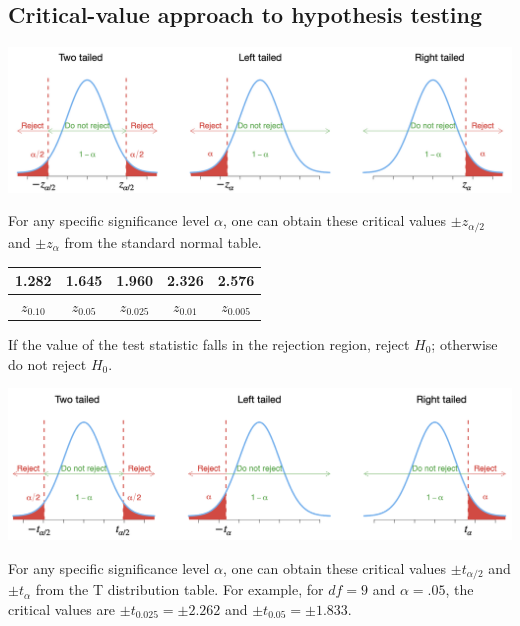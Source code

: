 \documentclass[
]{article}
\begin{document}
\hypertarget{critical-value-approach-to-hypothesis-testing}{%
\subsection{Critical-value approach to hypothesis
testing}\label{critical-value-approach-to-hypothesis-testing}}

\begin{center}\includegraphics[width=1.3\linewidth,height=1\textheight]{hypoztest} \end{center}

For any specific significance level \(\alpha\), one can obtain these
critical values \(\pm z_{\alpha/2}\) and \(\pm z_{\alpha}\) from the
standard normal table.

\begin{longtable}[]{@{}ccccc@{}}
\toprule()
1.282 & 1.645 & 1.960 & 2.326 & 2.576 \\
\midrule()
\endhead
\(z_{0.10}\) & \(z_{0.05}\) & \(z_{0.025}\) & \(z_{0.01}\) &
\(z_{0.005}\) \\
\bottomrule()
\end{longtable}

If the value of the test statistic falls in the rejection region, reject
\(H_0\); otherwise do not reject \(H_0\).

\begin{center}\includegraphics[width=1.3\linewidth,height=0.8\textheight]{hypottest} \end{center}

For any specific significance level \(\alpha\), one can obtain these
critical values \(\pm t_{\alpha/2}\) and \(\pm t_{\alpha}\) from the T
distribution table. For example, for \(df=9\) and \(\alpha=.05\), the
critical values are \(\pm t_{0.025}=\pm 2.262\) and
\(\pm t_{0.05}=\pm 1.833\).
\end{document}
